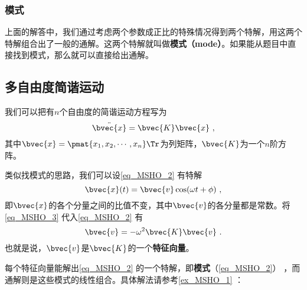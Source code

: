 \subsubsection{模式}

上面的解答中，我们通过考虑两个参数成正比的特殊情况得到两个特解，用这两个特解组合出了一般的通解。这两个特解就叫做\textbf{模式（mode）}。如果能从题目中直接找到模式，那么就可以直接给出通解。




\subsection{多自由度简谐运动}

我们可以把有$n$个自由度的简谐运动方程写为
\begin{equation}\label{eq_MSHO_2}
\ddot{\bvec{x}} = \bvec{K}\bvec{x}~,
\end{equation}
其中$\bvec{x}=\pmat{x_1, x_2, \cdots, x_n}\Tr$为列矩阵，$\bvec{K}$为一个$n$阶方阵。

类似找模式的思路，我们可以设\autoref{eq_MSHO_2} 有特解
\begin{equation}\label{eq_MSHO_3}
\bvec{x}(t) = \bvec{v}\cos(\omega t + \phi)~,
\end{equation}
即$\bvec{x}$的各个分量之间的比值不变，其中$\bvec{v}$的各分量都是常数。将\autoref{eq_MSHO_3} 代入\autoref{eq_MSHO_2} 有
\begin{equation}\label{eq_MSHO_5}
\bvec{v} = -\omega^2\bvec{K}\bvec{v}~.
\end{equation}
也就是说，$\bvec{v}$是$\bvec{K}$的一个\textbf{特征向量}。

每个特征向量能解出\autoref{eq_MSHO_2} 的一个特解，即\textbf{模式}（\autoref{eq_MSHO_2}） ，而通解则是这些模式的线性组合。具体解法请参考\autoref{ex_MSHO_1} ：






